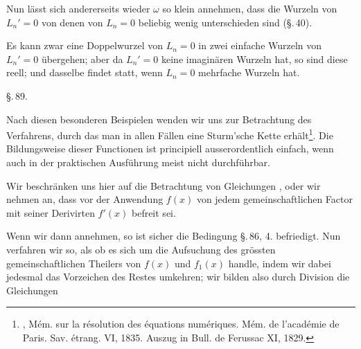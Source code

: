 Nun l\"asst sich andererseits wieder $\omega$ so klein annehmen, dass die Wurzeln von $L_n' = 0$ von denen von $L_n = 0$ beliebig wenig unterschieden sind (\S.\,40).

Es kann zwar eine Doppelwurzel von $L_n=0$ in zwei einfache Wurzeln von $L_n'=0$ \"ubergehen; aber da $L_n'=0$ keine imagin\"aren Wurzeln hat, so sind diese reell; und dasselbe findet statt, wenn $L_n=0$ mehrfache Wurzeln hat.


\begin{center}
\S.\,89.

\end{center}

Nach diesen besonderen Beispielen wenden wir uns zur Betrachtung des Verfahrens, durch das man in allen F\"allen eine Sturm'sche Kette erh\"alt\footnote{, M\'em. sur la r\'esolution des \'equations num\'eriques. M\'em. de l'acad\'emie de Paris. Sav. \'etrang. VI, 1835. Auszug in Bull. de Ferussac XI, 1829.}. Die Bildungsweise dieser Functionen ist principiell ausserordentlich einfach, wenn auch in der praktischen Ausf\"uhrung meist nicht durchf\"uhrbar.

Wir beschr\"anken uns hier auf die Betrachtung von Gleichungen , oder wir nehmen an, dass vor der Anwendung $f(x)$ von jedem gemeinschaftlichen Factor mit seiner Derivirten $f'(x)$ befreit sei.

Wenn wir dann
annehmen, so ist sicher die Bedingung \S.\,86, 4. befriedigt. Nun verfahren wir so, als ob es sich um die Aufsuchung des gr\"ossten gemeinschaftlichen Theilers von $f(x)$ und $f_1(x)$ handle, indem wir dabei jedesmal das Vorzeichen des Restes umkehren; wir bilden also durch Division die Gleichungen
